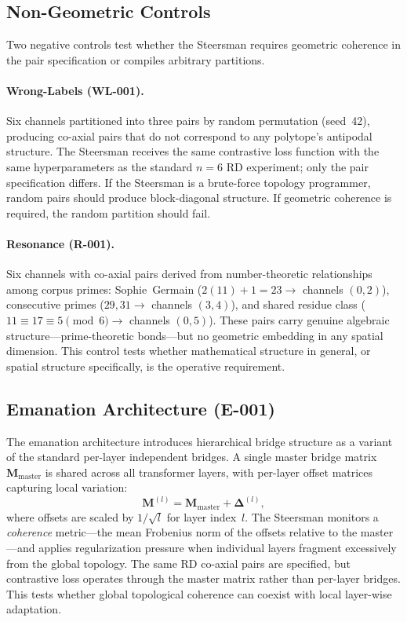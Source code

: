 \subsection{Non-Geometric Controls}
\label{sec:controls}

Two negative controls test whether the Steersman requires geometric
coherence in the pair specification or compiles arbitrary partitions.

\paragraph{Wrong-Labels (WL-001).}
Six channels partitioned into three pairs by random permutation
(seed~42), producing co-axial pairs that do not correspond to any
polytope's antipodal structure.  The Steersman receives the same
contrastive loss function with the same hyperparameters as the
standard $n{=}6$ RD experiment; only the pair specification differs.
If the Steersman is a brute-force topology programmer, random
pairs should produce block-diagonal structure.  If geometric
coherence is required, the random partition should fail.

\paragraph{Resonance (R-001).}
Six channels with co-axial pairs derived from number-theoretic
relationships among corpus primes:  Sophie~Germain
($2(11){+}1 {=} 23 \to$ channels $(0,2)$), consecutive primes
($29, 31 \to$ channels $(3,4)$), and shared residue class
($11 \equiv 17 \equiv 5 \pmod{6} \to$ channels $(0,5)$).  These
pairs carry genuine algebraic structure---prime-theoretic bonds---but
no geometric embedding in any spatial dimension.  This control tests
whether mathematical structure in general, or spatial structure
specifically, is the operative requirement.

\subsection{Emanation Architecture (E-001)}
\label{sec:emanation_method}

The emanation architecture introduces hierarchical bridge structure as
a variant of the standard per-layer independent bridges.  A single
master bridge matrix $\mathbf{M}_{\text{master}}$ is shared across all
transformer layers, with per-layer offset matrices capturing local
variation:
\begin{equation}
  \mathbf{M}^{(l)} = \mathbf{M}_{\text{master}} +
    \boldsymbol{\Delta}^{(l)},
  \label{eq:emanation}
\end{equation}
where offsets are scaled by $1/\sqrt{l}$ for layer index~$l$.  The
Steersman monitors a \emph{coherence} metric---the mean Frobenius norm
of the offsets relative to the master---and applies regularization
pressure when individual layers fragment excessively from the global
topology.  The same RD co-axial pairs are specified, but contrastive
loss operates through the master matrix rather than per-layer bridges.
This tests whether global topological coherence can coexist with local
layer-wise adaptation.

